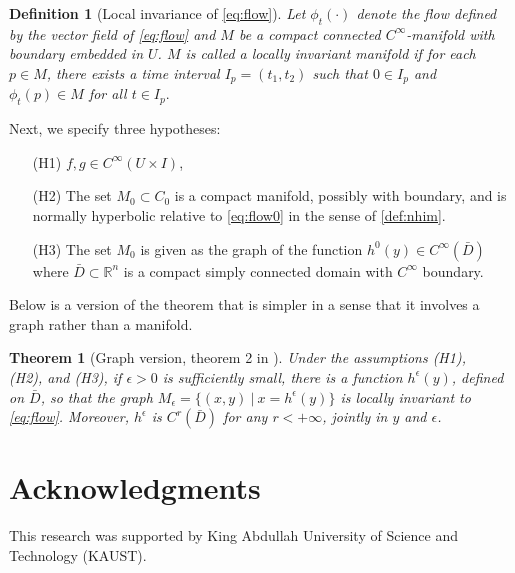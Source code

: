 \documentclass[a4paper,11pt]{article}
\newtheorem{theorem}{Theorem}
\newtheorem{definition}{Definition}[section]
\numberwithin{step}{dummy}
\begin{document}
\begin{definition}[Local invariance of \eqref{eq:flow}]
 Let $\phi_t(\cdot)$ denote the flow defined by the vector field of \eqref{eq:flow} and $M$ be a compact connected $C^\infty$-manifold with boundary embedded in $U$. $M$ is called a locally invariant manifold if for each $p\in M$, there exists a time interval $I_p=(t_1,t_2)$ such that $0\in I_p$ and $\phi_t(p) \in M$ for all $t\in I_p.$
\end{definition}
Next, we specify three hypotheses: 
\begin{enumerate}
 \item[(H1)] $f,g \in C^{\infty}(U \times I)$,
 \item[(H2)] The set $M_0 \subset C_0$ is a compact manifold, possibly with boundary, and is normally hyperbolic relative to \eqref{eq:flow0} in the sense of \eqref{def:nhim}.
 \item[(H3)] The set $M_0$ is given as the graph of the function $h^0(y) \in C^\infty(\bar{D})$ where $\bar{D} \subset \mathbb{R}^n$ is a compact simply connected domain with $C^\infty$ boundary.
\end{enumerate}
Below is a version of the theorem that is simpler in a sense that it involves a graph rather than a manifold. 
\begin{theorem}[Graph version, theorem 2 in \cite{jones_geometric_1995}] \label{thm:fenichel}
 Under the assumptions (H1),\\ (H2), and (H3), if $\epsilon>0$ is sufficiently small, there is a function $h^\epsilon(y)$, defined on $\bar{D}$, so that the graph $M_\epsilon = \{(x,y)~|~ x=h^\epsilon(y)\}$ is locally invariant to \eqref{eq:flow}. Moreover, $h^\epsilon$ is $C^r(\bar{D})$ for any $r<+\infty$, jointly in $y$ and $\epsilon$.
\end{theorem}


\section*{Acknowledgments}
This research was supported by King Abdullah University of Science and Technology (KAUST).
\end{document}
